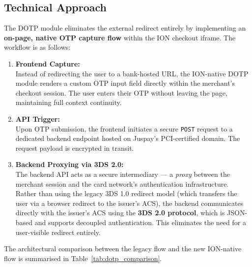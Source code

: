 \subsection{Technical Approach}

The DOTP module eliminates the external redirect entirely by implementing an \textbf{on-page, native OTP capture flow} within the ION checkout iframe. The workflow is as follows:

\begin{enumerate}
  \item \textbf{Frontend Capture:}\\
  Instead of redirecting the user to a bank-hosted URL, the ION-native DOTP module renders a custom OTP input field directly within the merchant's checkout session. The user enters their OTP without leaving the page, maintaining full context continuity.

  \item \textbf{API Trigger:}\\
  Upon OTP submission, the frontend initiates a secure \texttt{POST} request to a dedicated backend endpoint hosted on Juspay's PCI-certified domain. The request payload is encrypted in transit.

  \item \textbf{Backend Proxying via 3DS 2.0:}\\
  The backend API acts as a secure intermediary --- a \textit{proxy} between the merchant session and the card network's authentication infrastructure. Rather than using the legacy 3DS 1.0 redirect model (which transfers the user via a browser redirect to the issuer's ACS), the backend communicates directly with the issuer's ACS using the \textbf{3DS 2.0 protocol}, which is JSON-based and supports decoupled authentication. This eliminates the need for a user-visible redirect entirely.
\end{enumerate}

\par The architectural comparison between the legacy flow and the new ION-native flow is summarised in Table~\ref{tab:dotp_comparison}.


